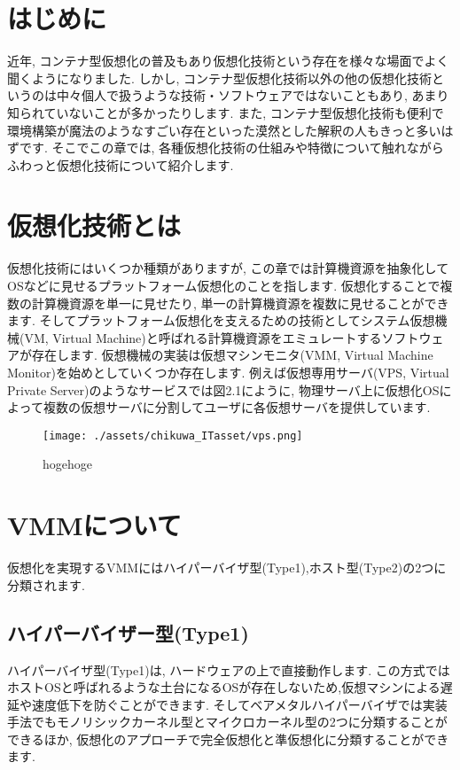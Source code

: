\section{はじめに}
近年, コンテナ型仮想化の普及もあり仮想化技術という存在を様々な場面でよく聞くようになりました. しかし, コンテナ型仮想化技術以外の他の仮想化技術というのは中々個人で扱うような技術・ソフトウェアではないこともあり, あまり知られていないことが多かったりします. また, コンテナ型仮想化技術も便利で環境構築が魔法のようなすごい存在といった漠然とした解釈の人もきっと多いはずです. そこでこの章では, 各種仮想化技術の仕組みや特徴について触れながらふわっと仮想化技術について紹介します.

\section{仮想化技術とは}
仮想化技術にはいくつか種類がありますが, この章では計算機資源を抽象化してOSなどに見せるプラットフォーム仮想化のことを指します. 仮想化することで複数の計算機資源を単一に見せたり, 単一の計算機資源を複数に見せることができます. そしてプラットフォーム仮想化を支えるための技術としてシステム仮想機械(VM, Virtual Machine)と呼ばれる計算機資源をエミュレートするソフトウェアが存在します. 仮想機械の実装は仮想マシンモニタ(VMM, Virtual Machine Monitor)を始めとしていくつか存在します. 例えば仮想専用サーバ(VPS, Virtual Private Server)のようなサービスでは図2.1にように, 物理サーバ上に仮想化OSによって複数の仮想サーバに分割してユーザに各仮想サーバを提供しています.
\begin{figure}[htbp]
    \centering
    \texttt{[image: ./assets/chikuwa\_ITasset/vps.png]}
    \caption{hogehoge}
    \label{fig:one}
\end{figure}

\section{VMMについて}
仮想化を実現するVMMにはハイパーバイザ型(Type1),ホスト型(Type2)の2つに分類されます.

\subsection{ハイパーバイザー型(Type1)}
ハイパーバイザ型(Type1)は, ハードウェアの上で直接動作します. この方式ではホストOSと呼ばれるような土台になるOSが存在しないため,仮想マシンによる遅延や速度低下を防ぐことができます. そしてベアメタルハイパーバイザでは実装手法でもモノリシックカーネル型とマイクロカーネル型の2つに分類することができるほか, 仮想化のアプローチで完全仮想化と準仮想化に分類することができます.
